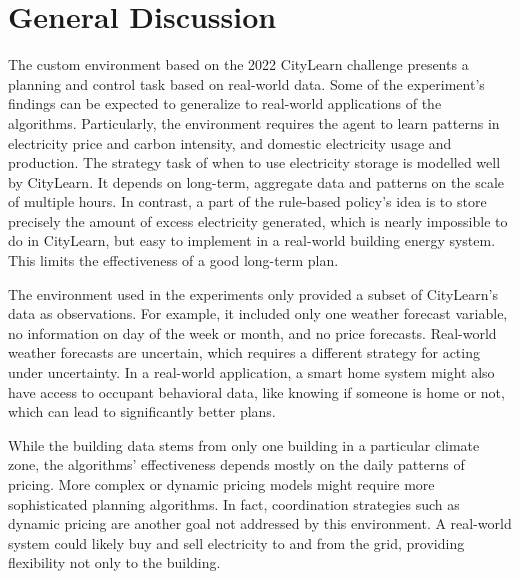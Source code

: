 \section{General Discussion}

The custom environment based on the 2022 CityLearn challenge presents a planning and control task based on real-world data.
Some of the experiment's findings can be expected to generalize to real-world applications of the algorithms.
Particularly, the environment requires the agent to learn patterns in electricity price and carbon intensity, and domestic electricity usage and production.
The strategy task of when to use electricity storage is modelled well by CityLearn.
It depends on long-term, aggregate data and patterns on the scale of multiple hours.
In contrast, a part of the rule-based policy's idea is to store precisely the amount of excess electricity generated, which is nearly impossible to do in CityLearn, but easy to implement in a real-world building energy system.
This limits the effectiveness of a good long-term plan.


The environment used in the experiments only provided a subset of CityLearn's data as observations.
For example, it included only one weather forecast variable, no information on day of the week or month, and no price forecasts.
Real-world weather forecasts are uncertain, which requires a different strategy for acting under uncertainty.
In a real-world application, a smart home system might also have access to occupant behavioral data, like knowing if someone is home or not, which can lead to significantly better plans.

While the building data stems from only one building in a particular climate zone, the algorithms' effectiveness depends mostly on the daily patterns of pricing.
More complex or dynamic pricing models might require more sophisticated planning algorithms.
In fact, coordination strategies such as dynamic pricing are another goal not addressed by this environment.
A real-world system could likely buy and sell electricity to and from the grid, providing flexibility not only to the building.


